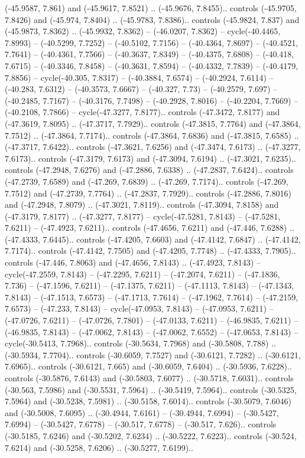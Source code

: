 \begin{scope}[shift={(2.5552, 9.9912)}]
\begin{scope}[shift={(48.1654, -14.8546)}]
(-45.9587, 7.861) and (-45.9617, 7.8521) .. (-45.9676, 7.8455).. controls (-45.9705, 7.8426) and (-45.974, 7.8404) .. (-45.9783, 7.8386).. controls (-45.9824, 7.837) and (-45.9873, 7.8362) .. (-45.9932, 7.8362) -- (-46.0207, 7.8362) -- cycle(-40.4465, 7.8993) -- (-40.5299, 7.7252) -- (-40.5102, 7.7156) -- (-40.4364, 7.8697) -- (-40.4521, 7.7641) -- (-40.4361, 7.7566) -- (-40.3637, 7.8349) -- (-40.4375, 7.6808) -- (-40.418, 7.6715) -- (-40.3346, 7.8458) -- (-40.3631, 7.8594) -- (-40.4332, 7.7839) -- (-40.4179, 7.8856) -- cycle(-40.305, 7.8317) -- (-40.3884, 7.6574) -- (-40.2924, 7.6114) -- (-40.283, 7.6312) -- (-40.3573, 7.6667) -- (-40.327, 7.73) -- (-40.2579, 7.697) -- (-40.2485, 7.7167) -- (-40.3176, 7.7498) -- (-40.2928, 7.8016) -- (-40.2204, 7.7669) -- (-40.2108, 7.7866) -- cycle(-47.3277, 7.8177).. controls (-47.3472, 7.8177) and (-47.3619, 7.8095) .. (-47.3717, 7.7929).. controls (-47.3815, 7.7764) and (-47.3864, 7.7512) .. (-47.3864, 7.7174).. controls (-47.3864, 7.6836) and (-47.3815, 7.6585) .. (-47.3717, 7.6422).. controls (-47.3621, 7.6256) and (-47.3474, 7.6173) .. (-47.3277, 7.6173).. controls (-47.3179, 7.6173) and (-47.3094, 7.6194) .. (-47.3021, 7.6235).. controls (-47.2948, 7.6276) and (-47.2886, 7.6338) .. (-47.2837, 7.6424).. controls (-47.2739, 7.6589) and (-47.269, 7.6839) .. (-47.269, 7.7174).. controls (-47.269, 7.7512) and (-47.2739, 7.7764) .. (-47.2837, 7.7929).. controls (-47.2886, 7.8016) and (-47.2948, 7.8079) .. (-47.3021, 7.8119).. controls (-47.3094, 7.8158) and (-47.3179, 7.8177) .. (-47.3277, 7.8177) -- cycle(-47.5281, 7.8143) -- (-47.5281, 7.6211) -- (-47.4923, 7.6211).. controls (-47.4656, 7.6211) and (-47.446, 7.6288) .. (-47.4333, 7.6445).. controls (-47.4205, 7.6603) and (-47.4142, 7.6847) .. (-47.4142, 7.7174).. controls (-47.4142, 7.7505) and (-47.4205, 7.7748) .. (-47.4333, 7.7905).. controls (-47.446, 7.8063) and (-47.4656, 7.8143) .. (-47.4923, 7.8143) -- cycle(-47.2559, 7.8143) -- (-47.2295, 7.6211) -- (-47.2074, 7.6211) -- (-47.1836, 7.736) -- (-47.1596, 7.6211) -- (-47.1375, 7.6211) -- (-47.1113, 7.8143) -- (-47.1343, 7.8143) -- (-47.1513, 7.6573) -- (-47.1713, 7.7614) -- (-47.1962, 7.7614) -- (-47.2159, 7.6573) -- (-47.233, 7.8143) -- cycle(-47.0953, 7.8143) -- (-47.0953, 7.6211) -- (-47.0726, 7.6211) -- (-47.0726, 7.7801) -- (-47.0133, 7.6211) -- (-46.9835, 7.6211) -- (-46.9835, 7.8143) -- (-47.0062, 7.8143) -- (-47.0062, 7.6552) -- (-47.0653, 7.8143) -- cycle(-30.5413, 7.7968).. controls (-30.5634, 7.7968) and (-30.5808, 7.788) .. (-30.5934, 7.7704).. controls (-30.6059, 7.7527) and (-30.6121, 7.7282) .. (-30.6121, 7.6965).. controls (-30.6121, 7.665) and (-30.6059, 7.6404) .. (-30.5936, 7.6228).. controls (-30.5876, 7.6143) and (-30.5803, 7.6077) .. (-30.5718, 7.6031).. controls (-30.563, 7.5986) and (-30.5531, 7.5964) .. (-30.5419, 7.5964).. controls (-30.5325, 7.5964) and (-30.5238, 7.5981) .. (-30.5158, 7.6014).. controls (-30.5079, 7.6046) and (-30.5008, 7.6095) .. (-30.4944, 7.6161) -- (-30.4944, 7.6994) -- (-30.5427, 7.6994) -- (-30.5427, 7.6778) -- (-30.517, 7.6778) -- (-30.517, 7.626).. controls (-30.5185, 7.6246) and (-30.5202, 7.6234) .. (-30.5222, 7.6223).. controls (-30.524, 7.6214) and (-30.5258, 7.6206) .. (-30.5277, 7.6199).. 
\end{scope}
\end{scope}
